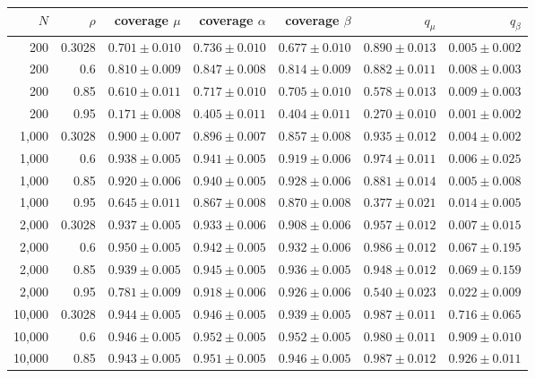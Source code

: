 {\small\setlength{\tabcolsep}{4pt}
\begin{tabular}{rrrrrrr}
\toprule
$N$ & $\rho$ & coverage $\mu$ & coverage $\alpha$ & coverage $\beta$ & $q_\mu$ & $q_\beta$ \\
\midrule
200 & 0.3028 & $0.701 \pm 0.010$ & $0.736 \pm 0.010$ & $0.677 \pm 0.010$ & $0.890 \pm 0.013$ & $0.005 \pm 0.002$ \\
200 & 0.6 & $0.810 \pm 0.009$ & $0.847 \pm 0.008$ & $0.814 \pm 0.009$ & $0.882 \pm 0.011$ & $0.008 \pm 0.003$ \\
200 & 0.85 & $0.610 \pm 0.011$ & $0.717 \pm 0.010$ & $0.705 \pm 0.010$ & $0.578 \pm 0.013$ & $0.009 \pm 0.003$ \\
200 & 0.95 & $0.171 \pm 0.008$ & $0.405 \pm 0.011$ & $0.404 \pm 0.011$ & $0.270 \pm 0.010$ & $0.001 \pm 0.002$ \\
1{,}000 & 0.3028 & $0.900 \pm 0.007$ & $0.896 \pm 0.007$ & $0.857 \pm 0.008$ & $0.935 \pm 0.012$ & $0.004 \pm 0.002$ \\
1{,}000 & 0.6 & $0.938 \pm 0.005$ & $0.941 \pm 0.005$ & $0.919 \pm 0.006$ & $0.974 \pm 0.011$ & $0.006 \pm 0.025$ \\
1{,}000 & 0.85 & $0.920 \pm 0.006$ & $0.940 \pm 0.005$ & $0.928 \pm 0.006$ & $0.881 \pm 0.014$ & $0.005 \pm 0.008$ \\
1{,}000 & 0.95 & $0.645 \pm 0.011$ & $0.867 \pm 0.008$ & $0.870 \pm 0.008$ & $0.377 \pm 0.021$ & $0.014 \pm 0.005$ \\
2{,}000 & 0.3028 & $0.937 \pm 0.005$ & $0.933 \pm 0.006$ & $0.908 \pm 0.006$ & $0.957 \pm 0.012$ & $0.007 \pm 0.015$ \\
2{,}000 & 0.6 & $0.950 \pm 0.005$ & $0.942 \pm 0.005$ & $0.932 \pm 0.006$ & $0.986 \pm 0.012$ & $0.067 \pm 0.195$ \\
2{,}000 & 0.85 & $0.939 \pm 0.005$ & $0.945 \pm 0.005$ & $0.936 \pm 0.005$ & $0.948 \pm 0.012$ & $0.069 \pm 0.159$ \\
2{,}000 & 0.95 & $0.781 \pm 0.009$ & $0.918 \pm 0.006$ & $0.926 \pm 0.006$ & $0.540 \pm 0.023$ & $0.022 \pm 0.009$ \\
10{,}000 & 0.3028 & $0.944 \pm 0.005$ & $0.946 \pm 0.005$ & $0.939 \pm 0.005$ & $0.987 \pm 0.011$ & $0.716 \pm 0.065$ \\
10{,}000 & 0.6 & $0.946 \pm 0.005$ & $0.952 \pm 0.005$ & $0.952 \pm 0.005$ & $0.980 \pm 0.011$ & $0.909 \pm 0.010$ \\
10{,}000 & 0.85 & $0.943 \pm 0.005$ & $0.951 \pm 0.005$ & $0.946 \pm 0.005$ & $0.987 \pm 0.012$ & $0.926 \pm 0.011$ \\

\end{tabular}}
